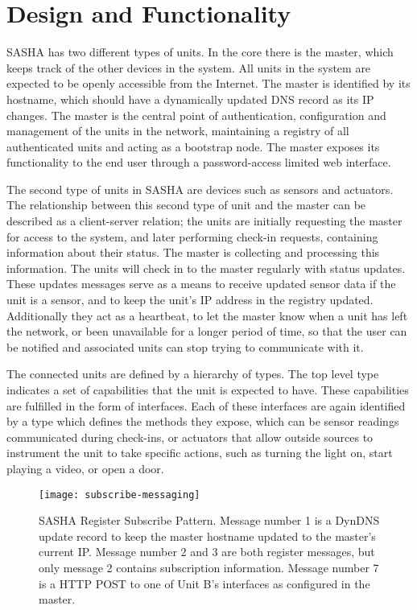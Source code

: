 \section{Design and Functionality}

SASHA has two different types of units. In the core there is the master, which keeps track of the other devices in the system. All units in the system are expected to be openly accessible from the Internet. The master is identified by its hostname, which should have a dynamically updated DNS record as its IP changes. The master is the central point of authentication, configuration and management of the units in the network, maintaining a registry of all authenticated units and acting as a bootstrap node. The master exposes its functionality to the end user through a password-access limited web interface.

The second type of units in SASHA are devices such as sensors and actuators. The relationship between this second type of unit and the master can be described as a client-server relation; the units are initially requesting the master for access to the system, and later performing check-in requests, containing information about their status. The master is collecting and processing this information. The units will check in to the master regularly with status updates. These updates messages serve as a means to receive updated sensor data if the unit is a sensor, and to keep the unit's IP address in the registry updated. Additionally they act as a heartbeat, to let the master know when a unit has left the network, or been unavailable for a longer period of time, so that the user can be notified and associated units can stop trying to communicate with it.

The connected units are defined by a hierarchy of types. The top level type indicates a set of capabilities that the unit is expected to have. These capabilities are fulfilled in the form of interfaces. Each of these interfaces are again identified by a type which defines the methods they expose, which can be sensor readings communicated during check-ins, or actuators that allow outside sources to instrument the unit to take specific actions, such as turning the light on, start playing a video, or open a door.

\begin{figure}[ht!]
    \centering
    \texttt{[image: subscribe-messaging]}
    \caption{SASHA Register Subscribe Pattern. Message number 1 is a DynDNS update record to keep the master hostname updated to the master's current IP. Message number 2 and 3 are both register messages, but only message 2 contains subscription information. Message number 7 is a HTTP POST to one of Unit B's interfaces as configured in the master.}
    \label{fig:subscribe-messaging}
\end{figure}

